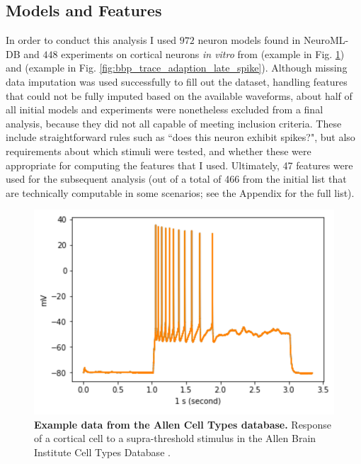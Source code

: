 


\subsection{Models and Features} 
In order to conduct this analysis I used $972$ neuron models found in NeuroML-DB \citep{birgiolas2016rapid} and $448$ experiments on cortical neurons \emph{in vitro} from \cite{gouwens2018systematic} (example in Fig. \ref{fig:adaptionm}) and \cite{markram2006blue} (example in Fig. \ref{fig:bbp_trace_adaption_late_spike}).
Although missing data imputation was used successfully to fill out the dataset, handling features that could not be fully imputed based on the available waveforms, about half of all initial models and experiments were nonetheless excluded from a final analysis, because they did not all capable of meeting inclusion criteria.
These include straightforward rules such as ``does this neuron exhibit spikes?", but also requirements about which stimuli were tested, and whether these were appropriate for computing the features that I used. 
Ultimately, 47 features were used for the subsequent analysis (out of a total of 466 from the initial list that are technically computable in some scenarios; see the Appendix for the full list).

\begin{figure}
    \begin{center}
    \includegraphics[width=0.6\linewidth]{figures/multi_spiking_large_allen}
    \caption[Example From Allen Cell Types Database]{\textbf{Example data from the Allen Cell Types database.}
    Response of a cortical cell to a supra-threshold stimulus in the Allen Brain Institute Cell Types Database \citep{gouwens2018systematic}.}
    \label{fig:adaptionm}
    \end{center}
\end{figure}    


